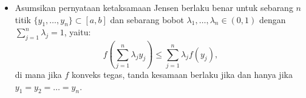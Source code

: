 \documentclass[aspectratio=169,11pt]{beamer}
\theoremstyle{definition}
\begin{document}
\begin{frame}[allowframebreaks]{\insertsection}{\insertsubsection}
\begin{itemize}
          $(\Leftarrow)$ Sebaliknya, jika $x_1=x_2=:c$, maka $\lambda_1+\lambda_2=1$ memberikan:
          \begin{align*}
            f(\lambda_1x_1+\lambda_2x_2)
             & =f\bigl((\lambda_1+\lambda_2)c\bigr)=f(c)                   \\
             & =(\lambda_1+\lambda_2)f(c)=\lambda_1f(x_1)+\lambda_2f(x_2).
          \end{align*}
          Jadi, tanda kesamaan berlaku. Dengan demikian, kedua arah terbukti dan pernyataan ketaksamaan Jensen beserta syarat kesamaannya benar untuk $n=2$.
    \item Asumsikan pernyataan ketaksamaan Jensen berlaku benar untuk sebarang $n$ titik $\{y_1, \dots, y_n\} \subset [a,b]$ dan sebarang bobot $\lambda_1, \dots, \lambda_n \in (0,1)$ dengan $\displaystyle \sum_{j=1}^n \lambda_j = 1$, yaitu:
          \begin{equation*}
            f\left( \sum_{j=1}^n \lambda_j y_j \right) \leq \sum_{j=1}^n \lambda_j f(y_j),
          \end{equation*}
          di mana jika $f$ konveks tegas, tanda kesamaan berlaku jika dan hanya jika $y_1 = y_2 = \dots = y_n$.


\end{itemize}
\end{frame}
\end{document}
